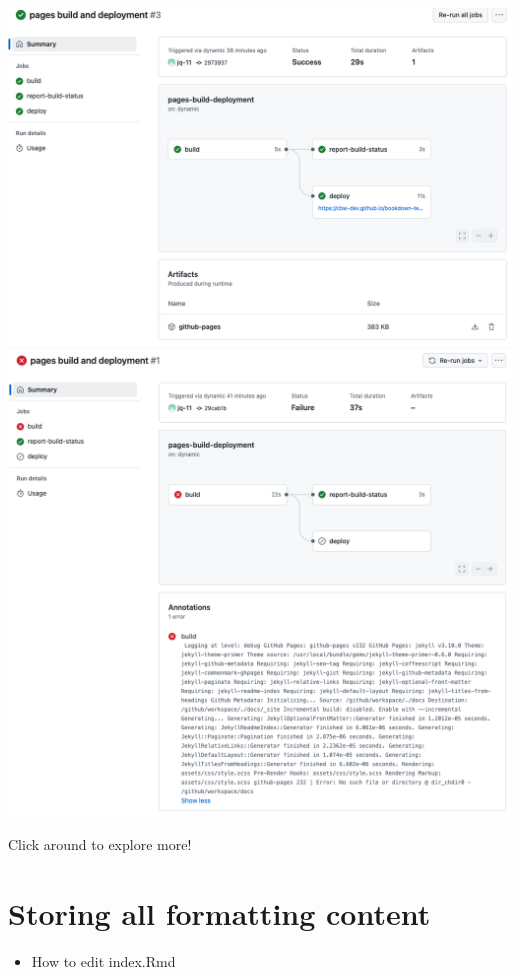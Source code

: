 \documentclass[
]{book}
\providecommand{\tightlist}{%
  \setlength{\itemsep}{0pt}\setlength{\parskip}{0pt}}
\theoremstyle{definition}
\theoremstyle{definition}
\theoremstyle{definition}
\theoremstyle{definition}
\theoremstyle{remark}
\begin{document}
\includegraphics{img/git-instruct/successful-deploy.png}
\includegraphics{img/git-instruct/failed-deploy.png}

Click around to explore more!

\chapter{Storing all formatting content}\label{storing-all-formatting-content}

\begin{itemize}
\tightlist
\item
  How to edit index.Rmd
\end{itemize}
\end{document}
